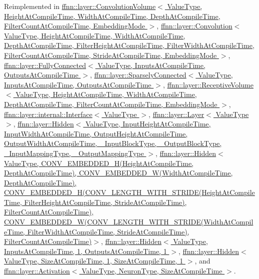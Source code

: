 Reimplemented in \hyperlink{classffnn_1_1layer_1_1_convolution_volume_aefb6f463f9533b290a5df3d1fc8e02ef}{ffnn\-::layer\-::\-Convolution\-Volume$<$ Value\-Type, Height\-At\-Compile\-Time, Width\-At\-Compile\-Time, Depth\-At\-Compile\-Time, Filter\-Count\-At\-Compile\-Time, Embedding\-Mode $>$}, \hyperlink{classffnn_1_1layer_1_1_convolution_a8e6ebb03724af8588b77c60aafd7da2a}{ffnn\-::layer\-::\-Convolution$<$ Value\-Type, Height\-At\-Compile\-Time, Width\-At\-Compile\-Time, Depth\-At\-Compile\-Time, Filter\-Height\-At\-Compile\-Time, Filter\-Width\-At\-Compile\-Time, Filter\-Count\-At\-Compile\-Time, Stride\-At\-Compile\-Time, Embedding\-Mode $>$}, \hyperlink{classffnn_1_1layer_1_1_fully_connected_a4d449a95d01e3ad04a7813d70d296e0c}{ffnn\-::layer\-::\-Fully\-Connected$<$ Value\-Type, Inputs\-At\-Compile\-Time, Outputs\-At\-Compile\-Time $>$}, \hyperlink{classffnn_1_1layer_1_1_sparsely_connected_a0996cd78dc2f76cab36fac2ec5c8f323}{ffnn\-::layer\-::\-Sparsely\-Connected$<$ Value\-Type, Inputs\-At\-Compile\-Time, Outputs\-At\-Compile\-Time $>$}, \hyperlink{classffnn_1_1layer_1_1_receptive_volume_aebfd8f149057b061d6880669376175e3}{ffnn\-::layer\-::\-Receptive\-Volume$<$ Value\-Type, Height\-At\-Compile\-Time, Width\-At\-Compile\-Time, Depth\-At\-Compile\-Time, Filter\-Count\-At\-Compile\-Time, Embedding\-Mode $>$}, \hyperlink{classffnn_1_1layer_1_1internal_1_1_interface_a88b5bd86aafd361d3a84dc6cba211195}{ffnn\-::layer\-::internal\-::\-Interface$<$ Value\-Type $>$}, \hyperlink{classffnn_1_1layer_1_1_layer_a23f5f3c958d888632010327471c7b012}{ffnn\-::layer\-::\-Layer$<$ Value\-Type $>$}, \hyperlink{classffnn_1_1layer_1_1_hidden_a696f61b2d9b661b7a8d6bdb3dc32b536}{ffnn\-::layer\-::\-Hidden$<$ Value\-Type, Input\-Height\-At\-Compile\-Time, Input\-Width\-At\-Compile\-Time, Output\-Height\-At\-Compile\-Time, Output\-Width\-At\-Compile\-Time, \-\_\-\-Input\-Block\-Type, \-\_\-\-Output\-Block\-Type, \-\_\-\-Input\-Mapping\-Type, \-\_\-\-Output\-Mapping\-Type $>$}, \hyperlink{classffnn_1_1layer_1_1_hidden_a696f61b2d9b661b7a8d6bdb3dc32b536}{ffnn\-::layer\-::\-Hidden$<$ Value\-Type, C\-O\-N\-V\-\_\-\-E\-M\-B\-E\-D\-D\-E\-D\-\_\-\-H(\-Height\-At\-Compile\-Time, Depth\-At\-Compile\-Time), C\-O\-N\-V\-\_\-\-E\-M\-B\-E\-D\-D\-E\-D\-\_\-\-W(\-Width\-At\-Compile\-Time, Depth\-At\-Compile\-Time), C\-O\-N\-V\-\_\-\-E\-M\-B\-E\-D\-D\-E\-D\-\_\-\-H(\-C\-O\-N\-V\-\_\-\-L\-E\-N\-G\-T\-H\-\_\-\-W\-I\-T\-H\-\_\-\-S\-T\-R\-I\-D\-E(\-Height\-At\-Compile\-Time, Filter\-Height\-At\-Compile\-Time, Stride\-At\-Compile\-Time), Filter\-Count\-At\-Compile\-Time), C\-O\-N\-V\-\_\-\-E\-M\-B\-E\-D\-D\-E\-D\-\_\-\-W(\-C\-O\-N\-V\-\_\-\-L\-E\-N\-G\-T\-H\-\_\-\-W\-I\-T\-H\-\_\-\-S\-T\-R\-I\-D\-E(\-Width\-At\-Compile\-Time, Filter\-Width\-At\-Compile\-Time, Stride\-At\-Compile\-Time), Filter\-Count\-At\-Compile\-Time)$>$}, \hyperlink{classffnn_1_1layer_1_1_hidden_a696f61b2d9b661b7a8d6bdb3dc32b536}{ffnn\-::layer\-::\-Hidden$<$ Value\-Type, Inputs\-At\-Compile\-Time, 1, Outputs\-At\-Compile\-Time, 1 $>$}, \hyperlink{classffnn_1_1layer_1_1_hidden_a696f61b2d9b661b7a8d6bdb3dc32b536}{ffnn\-::layer\-::\-Hidden$<$ Value\-Type, Size\-At\-Compile\-Time, 1, Size\-At\-Compile\-Time, 1 $>$}, and \hyperlink{classffnn_1_1layer_1_1_activation_a045ecc330b67cdc3a41d6d7fc3a8dbf2}{ffnn\-::layer\-::\-Activation$<$ Value\-Type, Neuron\-Type, Size\-At\-Compile\-Time $>$}.
